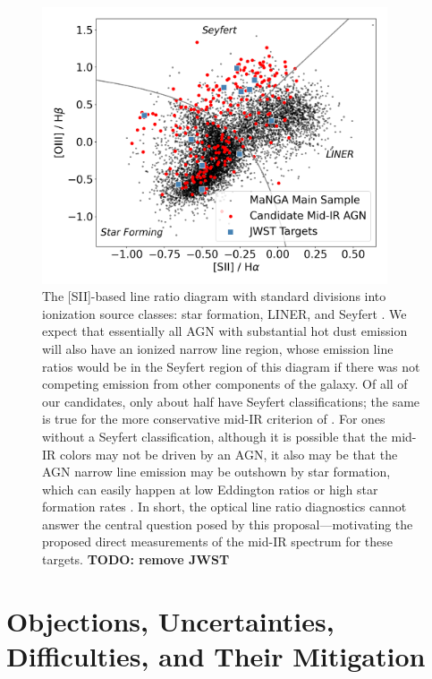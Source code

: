 \documentclass[12pt, preprint]{hacked-aastex}
\begin{document}
\begin{figure}[h!]
\begin{center}
\includegraphics[width=0.91\textwidth]{bpt-agn.png}
\end{center}
\caption{\label{fig:bpt} The [SII]-based line ratio diagram
  \cite{veilleux87a} with standard divisions into ionization source
  classes: star formation, LINER, and Seyfert \cite{kewley06a}.  We
  expect that essentially all AGN with substantial hot dust emission
  will also have an ionized narrow line region, whose emission line
  ratios would be in the Seyfert region of this diagram if there was
  not competing emission from other components of the galaxy. Of all
  of our candidates, only about half have Seyfert classifications; the
  same is true for the more conservative mid-IR criterion of
  \cite{assef18a}. For ones without a Seyfert classification, although
  it is possible that the mid-IR colors may not be driven by an AGN,
  it also may be that the AGN narrow line emission may be outshown by
  star formation, which can easily happen at low Eddington ratios or
  high star formation rates \cite{trump15a}.  In short, the optical
  line ratio diagnostics cannot answer the central question posed by
  this proposal---motivating the proposed direct measurements of the
  mid-IR spectrum for these targets.  {\bf TODO: remove JWST}}
\end{figure}

\section{Objections, Uncertainties, Difficulties, and Their Mitigation}
\label{sec:difficulties}
\end{document}
